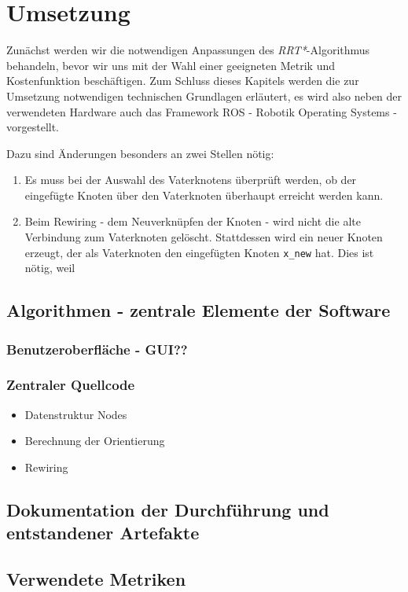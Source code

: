 \section{Umsetzung}
Zunächst werden wir die notwendigen Anpassungen des \textit{RRT*}-Algorithmus behandeln, bevor wir uns mit der Wahl einer geeigneten Metrik und Kostenfunktion beschäftigen. Zum Schluss dieses Kapitels werden die zur Umsetzung notwendigen technischen Grundlagen erläutert, es wird also neben der verwendeten Hardware auch das Framework ROS - Robotik Operating Systems - vorgestellt.


Dazu sind Änderungen besonders an zwei Stellen nötig: 
\begin{enumerate}
\item Es muss bei der Auswahl des Vaterknotens überprüft werden, ob der eingefügte Knoten über den Vaterknoten überhaupt erreicht werden kann.
\item Beim Rewiring - dem Neuverknüpfen der Knoten - wird nicht die alte Verbindung zum Vaterknoten gelöscht. Stattdessen wird ein neuer Knoten erzeugt, der als Vaterknoten den eingefügten Knoten \verb|x_new| hat. Dies ist nötig, weil 
\end{enumerate}


\subsection{Algorithmen - zentrale Elemente der Software}
\subsubsection{Benutzeroberfläche - GUI??}
\subsubsection{Zentraler Quellcode}
\begin{itemize}
\item  Datenstruktur Nodes
\item Berechnung der Orientierung
\item Rewiring
\end{itemize}
\subsection{Dokumentation der Durchführung und entstandener Artefakte}
\subsection{Verwendete Metriken}
